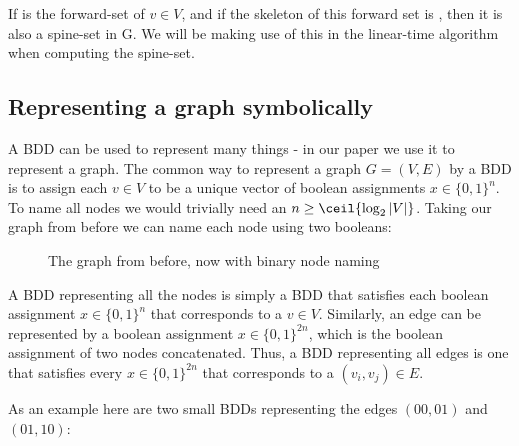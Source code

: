 \documentclass[../master/master.tex]{subfiles}
\begin{document}
If  is the forward-set of $v \in V$, and if the skeleton of this forward set is , then it is also a spine-set in G. We will be making use of this in the linear-time algorithm when computing the spine-set. 

\subsection{Representing a graph symbolically}
A BDD can be used to represent many things - in our paper we use it to represent a graph. The common way to represent a graph $G = (V, E)$ by a BDD is to assign each $v\in V$ to be a unique vector of boolean assignments $x\in\{0,1\}^n$. To name all nodes we would trivially need an $n \geq \ceil{\log_2{|V|}}$. Taking our graph from before we can name each node using two booleans:

\begin{figure}[H]
\center
{}
\caption{The graph from before, now with binary node naming}
\label{graphforbdd}
\end{figure}

A BDD representing all the nodes is simply a BDD that satisfies each boolean assignment $x\in\{0,1\}^n$ that corresponds to a $v\in V$. Similarly, an edge can be represented by a boolean assignment $x\in\{0,1\}^{2n}$, which is the boolean assignment of two nodes concatenated. Thus, a BDD representing all edges is one that satisfies every $x\in\{0,1\}^{2n}$ that corresponds to a $(v_i, v_j)\in E$.

As an example here are two small BDDs representing the edges $(00,01)$ and $(01,10)$:
\end{document}
